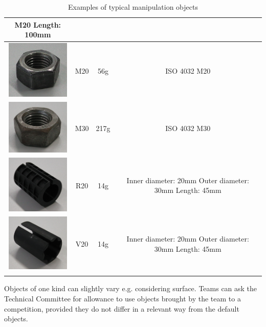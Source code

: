 \begin{table}[p]
\begin{tabular}{|c|c|c|c|}
M20 \newline
Length: 100mm \\ 
\hline 
\includegraphics[width=3cm]{../images/M20.jpg} & M20 & 56g & ISO 4032 \newline M20 \\
\hline 
\includegraphics[width=3cm]{../images/M30.jpg} & M30 & 217g & ISO 4032 \newline M30 \\ 
\hline 
\includegraphics[width=3cm]{../images/R20.jpg} & R20 & 14g & Inner diameter: 20mm \newline
Outer diameter: 30mm
Length: 45mm \\ 
\hline 
\includegraphics[width=3cm]{../images/V20.jpg} & V20 & 14g & Inner diameter: 20mm \newline
Outer diameter: 30mm \newline
Length: 45mm \\ 
\hline 
\label{tab:manipulation_objects}
\end{tabular} 

\caption{Examples of typical manipulation objects}

\end{table}

Objects of one kind can slightly vary e.g. considering surface. Teams can ask the Technical Committee for allowance to use objects brought by the team to a competition, provided they do not differ in a relevant way from the default objects.


